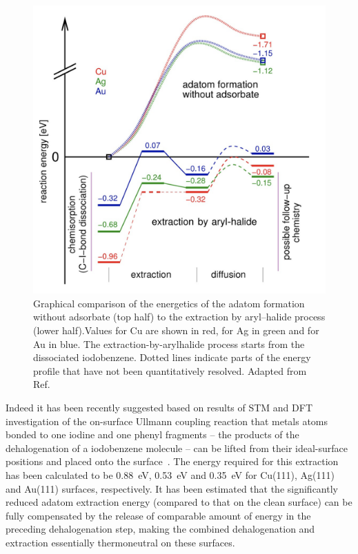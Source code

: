 \documentclass[%
 reprint,
 amsmath,amssymb,
 aps,
prb,
floatfix,
]{revtex4-2}
\newcommand{\lock}{\color{red}}
\newcommand{\lock}{\color{black}}
\begin{document}
\begin{figure}[htb]
\centering
\includegraphics[width=0.75\columnwidth]{Fig/Adatom-formation.png}
\caption{Graphical comparison of the energetics of the adatom formation without adsorbate (top half) to the extraction by aryl–halide process (lower half).Values for Cu are shown in red, for Ag in green and for Au in blue. The extraction-by-arylhalide process starts from the dissociated iodobenzene. Dotted lines indicate parts of the energy profile that have not been quantitatively resolved. Adapted from Ref.~\cite{chemeurope2017}}
\label{fig:3}
\end{figure}

\fi

{\lock

Indeed it has been recently suggested based on results of STM and DFT investigation of the on-surface Ullmann coupling reaction	 that metals atoms bonded to one iodine and one phenyl fragments -- the products of the dehalogenation of a iodobenzene molecule -- can be lifted from their ideal-surface positions and placed onto the surface~\cite{chemeurope2017}. 
%
The energy required for this extraction has been calculated to be \SI{0.88}{\electronvolt}, \SI{0.53}{\electronvolt} and \SI{0.35}{\electronvolt} for Cu(111), Ag(111) and Au(111) surfaces, respectively. %
%
It has been estimated that the significantly reduced adatom extraction energy (compared to that on the clean surface) can be fully compensated by the release of comparable amount of energy in the preceding dehalogenation step, making the combined dehalogenation and extraction essentially thermoneutral on these surfaces.


}
\end{document}
